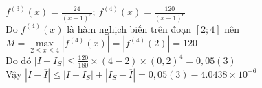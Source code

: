 $f^{\left(3\right)}\left(x\right) =\frac{24}{\left(x-1\right)^5}$; $f^{\left(4\right)}\left(x\right)=\frac{120}{\left(x-1\right)^6}$\\
Do $f^{\left(4\right)}\left(x\right)$ là hàm nghịch biến trên đoạn $\left[2;4\right]$ nên $M=\underset{2 \leq x \leq 4}{\max} \left| f^{\left(4\right)}\left(x\right) \right| = \left| f^{\left(4\right)}\left(2\right) \right|= 120$\\
Do đó $\left| I - I_{S} \right| \leq \frac{120}{180}\times \left(4-2\right) \times \left(0,2\right)^4=0,05\left(3\right) $\\
Vậy $\left| I-\overline{I}\right| \leq \left| I- I_S\right| + \left|I_S -\overline{I}\right|=0,05\left(3\right) - 4.0438\times 10^{-6}$\\



